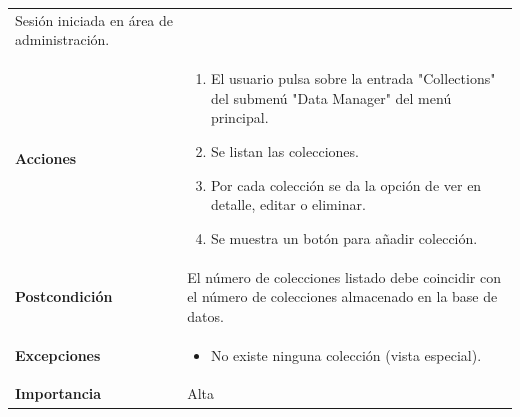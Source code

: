 \documentclass[
]{article}
\providecommand{\tightlist}{%
  \setlength{\itemsep}{0pt}\setlength{\parskip}{0pt}}
\begin{document}
\begin{longtable}[]{@{}ll@{}}
\begin{minipage}[t]{0.76\columnwidth}
Sesión iniciada en área de administración.\strut
\end{minipage}\tabularnewline
\begin{minipage}[t]{0.18\columnwidth}\raggedright
\textbf{Acciones}\strut
\end{minipage} & \begin{minipage}[t]{0.76\columnwidth}\raggedright
\begin{enumerate}
\def\labelenumi{\arabic{enumi}.}
\tightlist
\item
  El usuario pulsa sobre la entrada "Collections" del submenú "Data
  Manager" del menú principal.
\item
  Se listan las colecciones.
\item
  Por cada colección se da la opción de ver en detalle, editar o
  eliminar.
\item
  Se muestra un botón para añadir colección.
\end{enumerate}\strut
\end{minipage}\tabularnewline
\begin{minipage}[t]{0.18\columnwidth}\raggedright
\textbf{Postcondición}\strut
\end{minipage} & \begin{minipage}[t]{0.76\columnwidth}\raggedright
El número de colecciones listado debe coincidir con el número de
colecciones almacenado en la base de datos.\strut
\end{minipage}\tabularnewline
\begin{minipage}[t]{0.18\columnwidth}\raggedright
\textbf{Excepciones}\strut
\end{minipage} & \begin{minipage}[t]{0.76\columnwidth}\raggedright
\begin{itemize}
\tightlist
\item
  No existe ninguna colección (vista especial).
\end{itemize}\strut
\end{minipage}\tabularnewline
\begin{minipage}[t]{0.18\columnwidth}\raggedright
\textbf{Importancia}\strut
\end{minipage} & \begin{minipage}[t]{0.76\columnwidth}\raggedright
Alta\strut
\end{minipage}\tabularnewline
\bottomrule
\end{longtable}
\end{document}
